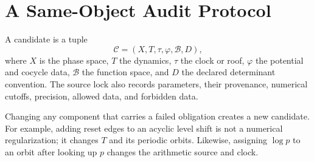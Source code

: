 \section{A Same-Object Audit Protocol}
\label{sec:protocol}

\begin{definition}
A candidate is a tuple
\[
  \mathcal C=(X,T,\tau,\varphi,\mathcal B,D),
\]
where \(X\) is the phase space, \(T\) the dynamics, \(\tau\) the clock or roof,
\(\varphi\) the potential and cocycle data, \(\mathcal B\) the function space,
and \(D\) the declared determinant convention.  The source lock also records
parameters, their provenance, numerical cutoffs, precision, allowed data, and
forbidden data.
\end{definition}

Changing any component that carries a failed obligation creates a new
candidate.  For example, adding reset edges to an acyclic level shift is not a
numerical regularization; it changes \(T\) and its periodic orbits.  Likewise,
assigning \(\log p\) to an orbit after looking up \(p\) changes the arithmetic
source and clock.

